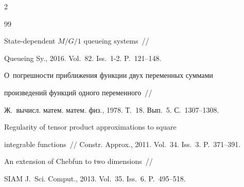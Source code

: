 \begin{multicols}{2}
{{\begin{thebibliography}{99}


 State-dependent ${M/G/1}$ queueing systems~//


Queueing Sy., 2016. Vol.~82. Iss.~1-2. P.~121--148.





\columnbreak









О~погрешности приближения функции двух переменных суммами


произведений функций одного переменного~//


Ж.~вычисл. матем. матем. физ., 1978. Т.~18. Вып.~5. С.~1307--1308.







\vspace*{7pt}







 Regularity of tensor product approximations to square


integrable functions~// Constr. Approx., 2011. Vol.~34. Iss.~3. P.~371--391.





\vspace*{7pt}







 An extension of Chebfun to two dimensions~// 


SIAM J.~Sci. Comput., 2013. Vol.~35. Iss.~6. P.~495--518.











 \end{thebibliography}





 }


 }





\end{multicols}





